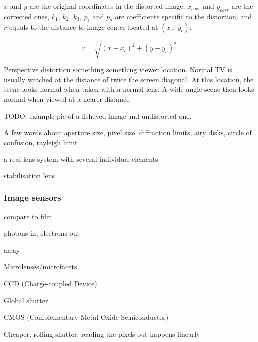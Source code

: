 $x$ and $y$ are the original coordinates in the distorted image, $x_{corr}$ and $y_{corr}$ are the corrected ones, $k_1$, $k_2$, $k_3$, $p_1$ and $p_2$ are coefficients specific to the distortion, and $r$ equals to the distance to image center located at $(x_c,~y_c)$:

\begin{equation}
r = \sqrt{(x - x_c)^2 + (y - y_c)^2}
\end{equation}


Perspective distortion something something viewer location. Normal TV is usually watched at the distance of twice the screen diagonal. At this location, the scene looks normal when taken with a normal lens. A wide-angle scene then looks normal when viewed at a nearer distance. \cite{wilson2004anton}



TODO: example pic of a fisheyed image and undistorted one.


A few words about aperture size, pixel size, diffraction limits, airy disks, circle of confusion, rayleigh limit

a real lens system with several individual elements

stabilisation lens


\subsubsection{Image sensors} %

compare to film

photons in, electrons out

array

Microlenses/microfacets

CCD (Charge-coupled Device)

Global shutter

CMOS (Complementary Metal-Oxide Semiconductor)

Cheaper, rolling shutter: reading the pixels out happens linearly

